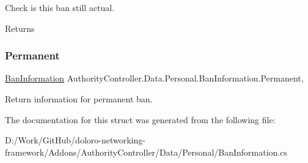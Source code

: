 Check is this ban still actual. 

\begin{DoxyReturn}{Returns}

\end{DoxyReturn}
\mbox{\label{struct_authority_controller_1_1_data_1_1_personal_1_1_ban_information_a129ecfe581f8d778a6b71cd13b7e8b77}} 
\subsubsection{\texorpdfstring{Permanent}{Permanent}}
{\footnotesize\ttfamily \mbox{\hyperlink{struct_authority_controller_1_1_data_1_1_personal_1_1_ban_information}{Ban\+Information}} Authority\+Controller.\+Data.\+Personal.\+Ban\+Information.\+Permanent\hspace{0.3cm}{\ttfamily [static]}, {\ttfamily [get]}}



Return information for permanent ban. 



The documentation for this struct was generated from the following file\+:\begin{DoxyCompactItemize}
\item 
D\+:/\+Work/\+Git\+Hub/doloro-\/networking-\/framework/\+Addons/\+Authority\+Controller/\+Data/\+Personal/Ban\+Information.\+cs\end{DoxyCompactItemize}
